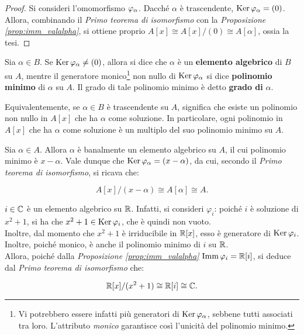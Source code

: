 \begin{proof}
    Si consideri l'omomorfismo $\varphi_\alpha$. Dacché $\alpha$ è
    trascendente, $\operatorname{Ker} \varphi_\alpha  = (0)$. Allora, combinando
    il \textit{Primo teorema di isomorfismo} con la
    \textit{Proposizione \ref{prop:imm_valalpha}}, si ottiene
    proprio $A[x] \cong A[x]/(0) \cong A[\alpha]$, ossia la tesi.
\end{proof}

\begin{definition}
    Sia $\alpha \in B$. Se $\operatorname{Ker} \varphi_\alpha \neq (0)$, allora si
    dice che $\alpha$ è un \textbf{elemento algebrico} di
    $B$ su $A$, mentre il generatore monico\footnote{Vi potrebbero
        essere infatti più generatori di $\operatorname{Ker} \varphi_\alpha$, sebbene
        tutti associati tra loro. L'attributo \textit{monico} garantisce
        così l'unicità del polinomio minimo.} non nullo di $\operatorname{Ker} \varphi_\alpha$ si
    dice \textbf{polinomio minimo} di $\alpha$ su $A$. Il grado
    di tale polinomio minimo è detto \textbf{grado di} $\alpha$.
\end{definition}

\begin{remark*}
    Equivalentemente, se $\alpha \in B$ è trascendente su $A$,
    significa che esiste un polinomio non nullo in $A[x]$ che ha $\alpha$ come
    soluzione. In particolare, ogni polinomio in $A[x]$ che ha
    $\alpha$ come soluzione è un multiplo del suo polinomio
    minimo su $A$.
\end{remark*}

\begin{example}
    Sia $\alpha \in A$. Allora $\alpha$ è banalmente un elemento
    algebrico su $A$, il cui polinomio minimo è $x-\alpha$. Vale
    dunque che $\operatorname{Ker} \varphi_\alpha = (x-\alpha)$, da cui, secondo
    il \textit{Primo teorema di isomorfismo}, si ricava che:

    \[ A[x]/(x-\alpha) \cong A[\alpha] \cong A. \]
\end{example}

\begin{example}
    $i \in \mathbb C$ è un elemento algebrico su $\mathbb R$. Infatti, si
    consideri $\varphi_i$: poiché $i$ è soluzione di $x^2+1$,
    si ha che $x^2+1 \in \operatorname{Ker} \varphi_i$, che è quindi non vuoto. \\

    Inoltre, dal momento che $x^2+1$ è irriducibile in $\mathbb R[x]$,
    esso è generatore di
    $\operatorname{Ker} \varphi_i$. Inoltre, poiché monico, è anche il
    polinomio minimo di $i$ su $\mathbb R$. \\

    Allora, poiché dalla \textit{Proposizione
        \ref{prop:imm_valalpha}} $\operatorname{Imm} \varphi_i = \mathbb R[i]$, si deduce dal \textit{Primo teorema di isomorfismo} che:

    \[ \mathbb{R}[x]/(x^2+1) \cong \mathbb R[i] \cong \mathbb C. \]
\end{example}

